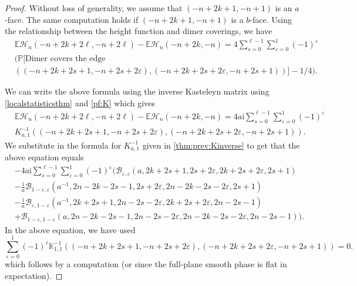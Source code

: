 \documentclass[11pt,twoside]{amsart}
\theoremstyle{plain}
\numberwithin{quest}{section}
\theoremstyle{remark}
\numberwithin{rem}{section}
\theoremstyle{definition}
\newcommand{\eps}{\varepsilon}
\begin{document}
	\begin{proof}
		Without loss of generality, we assume that $(-n+2k+1,-n+1)$ is an $a$-face. The same computation holds if $(-n+2k+1,-n+1)$ is a $b$-face.  
		Using the relationship between the height function and dimer coverings, we have
		\begin{equation*}
			\begin{split}
				&\mathbb{E}\mathcal{H}_n(-n+2k+2\ell,-n+2\ell)-\mathbb{E}\mathcal{H}_n(-n+2k,-n)=4\sum_{s=0}^{\ell-1}\sum_{\eps=0}^1 (-1)^\eps\\& \big( \mathbb{P}[\mbox{Dimer covers the edge}\\&((-n+2k+2s+1,-n+2s+2\eps),(-n+2k+2s+2\eps,-n+2s+1))]-1/4\big).
			\end{split}
		\end{equation*}
        
		We can write the above formula using the inverse Kasteleyn matrix using \cref{localstatisticsthm} and \eqref{pf:K} which gives
		\begin{equation}
        \label{E:Kasteleyn-sum}
			\begin{split}
				&\mathbb{E}\mathcal{H}_n(-n+2k+2\ell,-n+2\ell)-\mathbb{E}\mathcal{H}_n(-n+2k,-n)= 4 a \mathrm{i} \sum_{s=0}^{\ell-1}\sum_{\eps=0}^1(-1)^\eps \\& K^{-1}_{a,1}((-n+2k+2s+1,-n+2s+2\eps),(-n+2k+2s+2\eps,-n+2s+1)).
			\end{split}
		\end{equation}
		We substitute in the formula for $K_{a,1}^{-1}$ given in \cref{thm:prev:Kinverse} to get that the above equation equals
		\begin{equation} \label{E:expectationexpansion}
			\begin{split}
				&-4 a \mathrm{i} \sum_{s=0}^{\ell-1}\sum_{\eps=0}^1(-1)^\eps  \big(
				\mathcal{B}_{\eps,\eps}(a,2k+2s+1,2s+2\eps,2k+2s+2\eps,2s+1)\\
				&-\frac{\mathrm{i}}{{a}}\mathcal{B}_{1-\eps,\eps}(a^{-1},2n-2k-2s-1,2s+2\eps,2n-2k-2s-2\eps,2s+1)\\
				&-\frac{\mathrm{i}}{{a}}\mathcal{B}_{\eps,1-\eps}(a^{-1},2k+2s+1,2n-2s-2\eps,2k+2s+2\eps,2n-2s-1)\\
				&+\mathcal{B}_{1-\eps,1-\eps}(a,2n-2k-2s-1,2n-2s-2\eps,2n-2k-2s-2\eps,2n-2s-1)\big).
			\end{split}
		\end{equation}
		In the above equation, we have used 
		\begin{equation*}
			\sum_{\eps=0}^1(-1)^\eps \mathbb{K}^{-1}_{1,1}((-n+2k+2s+1,-n+2s+2\eps),(-n+2k+2s+2\eps,-n+2s+1))=0.
		\end{equation*}
		which follows by a computation (or since the full-plane smooth phase is flat in expectation). 
		

\end{proof}
\end{document}
